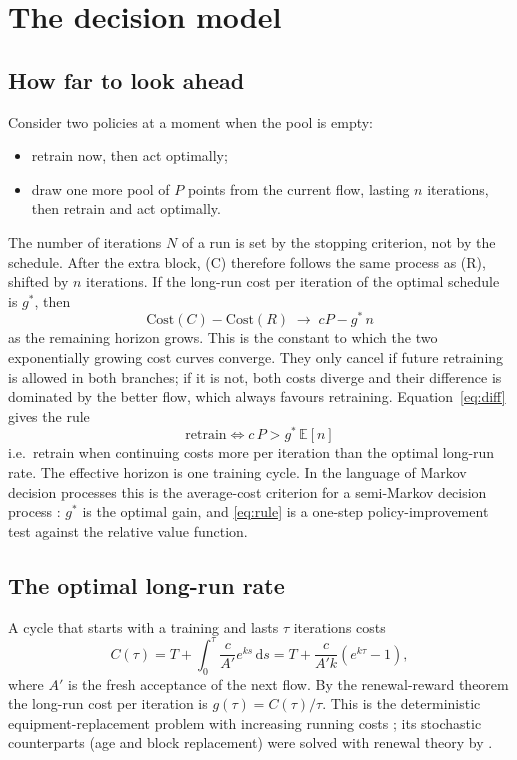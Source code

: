 \documentclass[11pt,a4paper]{article}
\newcommand{\E}{\mathbb{E}}
\begin{document}
\section{The decision model}

\subsection{How far to look ahead}

Consider two policies at a moment when the pool is empty:
\begin{itemize}
  \item[(R)] retrain now, then act optimally;
  \item[(C)] draw one more pool of $P$ points from the current flow, lasting
        $n$ iterations, then retrain and act optimally.
\end{itemize}
The number of iterations $N$ of a run is set by the stopping criterion, not by
the schedule. After the extra block, (C) therefore follows the same process as
(R), shifted by $n$ iterations. If the long-run cost per iteration of the
optimal schedule is $g^*$, then
\begin{equation}
  \mathrm{Cost}(C)-\mathrm{Cost}(R) \;\longrightarrow\; cP - g^*\,n
  \label{eq:diff}
\end{equation}
as the remaining horizon grows. This is the constant to which the two
exponentially growing cost curves converge. They only cancel if future
retraining is allowed in both branches; if it is not, both costs diverge and
their difference is dominated by the better flow, which always favours
retraining. Equation~\eqref{eq:diff} gives the rule
\begin{equation}
  \boxed{\text{retrain} \iff c\,P > g^*\,\E[n]}
  \label{eq:rule}
\end{equation}
i.e.\ retrain when continuing costs more per iteration than the optimal
long-run rate. The effective horizon is one training cycle. In the
language of Markov decision processes this is the average-cost criterion for
a semi-Markov decision process \citep{Puterman1994,Tijms2003}: $g^*$ is the
optimal gain, and \eqref{eq:rule} is a one-step policy-improvement test
against the relative value function.

\subsection{The optimal long-run rate}

A cycle that starts with a training and lasts $\tau$ iterations costs
\begin{equation}
  C(\tau) = T + \int_0^\tau \frac{c}{A'}e^{ks}\,\mathrm{d}s
          = T + \frac{c}{A'k}\left(e^{k\tau}-1\right),
\end{equation}
where $A'$ is the fresh acceptance of the next flow. By the renewal-reward
theorem \citep{Ross1970} the long-run cost per iteration is
$g(\tau)=C(\tau)/\tau$. This is the deterministic equipment-replacement
problem with increasing running costs
\citep{Taylor1923,Hotelling1925,Bellman1955}; its stochastic counterparts
(age and block replacement) were solved with renewal theory by
\citet{BarlowHunter1960} \citep[see also][]{Nakagawa2005}.
\end{document}
